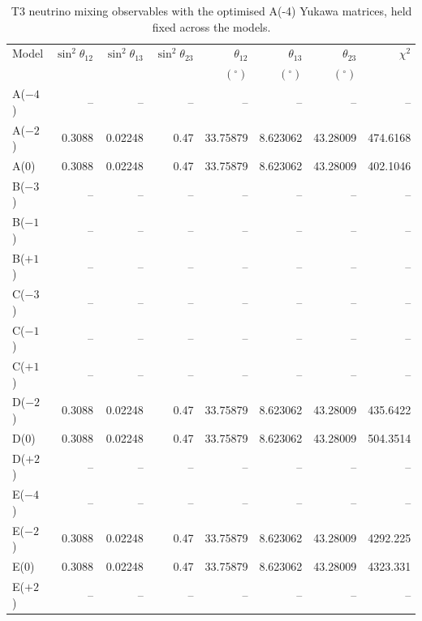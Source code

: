 \begin{table}[p]
\centering
\caption{T3 neutrino mixing observables with the optimised A(-4) Yukawa matrices, held fixed across the models.}
\label{tab:appC_Am4_mixing}
\begingroup
\footnotesize
\setlength{\tabcolsep}{3.2pt}
\begin{tabular}{lrrrrrrr}
\hline
Model & $\sin^2\theta_{12}$ & $\sin^2\theta_{13}$ & $\sin^2\theta_{23}$ & $\theta_{12}$ & $\theta_{13}$ & $\theta_{23}$ & $\chi^2$ \\
 &  &  &  & $(^\circ)$ & $(^\circ)$ & $(^\circ)$ &  \\
\hline
A($-4$) & -- & -- & -- & -- & -- & -- & -- \\
A($-2$) & 0.3088 & 0.02248 & 0.47 & 33.75879 & 8.623062 & 43.28009 & 474.6168 \\
A($0$) & 0.3088 & 0.02248 & 0.47 & 33.75879 & 8.623062 & 43.28009 & 402.1046 \\
B($-3$) & -- & -- & -- & -- & -- & -- & -- \\
B($-1$) & -- & -- & -- & -- & -- & -- & -- \\
B($+1$) & -- & -- & -- & -- & -- & -- & -- \\
C($-3$) & -- & -- & -- & -- & -- & -- & -- \\
C($-1$) & -- & -- & -- & -- & -- & -- & -- \\
C($+1$) & -- & -- & -- & -- & -- & -- & -- \\
D($-2$) & 0.3088 & 0.02248 & 0.47 & 33.75879 & 8.623062 & 43.28009 & 435.6422 \\
D($0$) & 0.3088 & 0.02248 & 0.47 & 33.75879 & 8.623062 & 43.28009 & 504.3514 \\
D($+2$) & -- & -- & -- & -- & -- & -- & -- \\
E($-4$) & -- & -- & -- & -- & -- & -- & -- \\
E($-2$) & 0.3088 & 0.02248 & 0.47 & 33.75879 & 8.623062 & 43.28009 & 4292.225 \\
E($0$) & 0.3088 & 0.02248 & 0.47 & 33.75879 & 8.623062 & 43.28009 & 4323.331 \\
E($+2$) & -- & -- & -- & -- & -- & -- & -- \\
\hline
\end{tabular}
\endgroup
\end{table}
